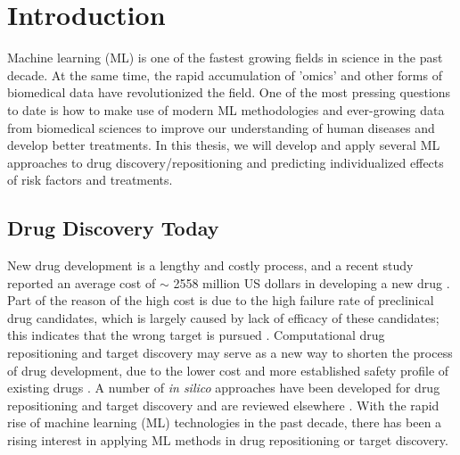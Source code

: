 \chapter{Introduction}
  Machine learning (ML) is one of the fastest growing fields in science in the past decade. At the same time, the rapid accumulation of 'omics' and other forms of biomedical data have revolutionized the field. One of the most pressing questions to date is how to make use of modern ML methodologies and ever-growing data from biomedical sciences to improve our understanding of human diseases and develop better treatments. In this thesis, we will develop and apply several ML approaches to drug discovery/repositioning and predicting individualized effects of risk factors and treatments. 

  \section{Drug Discovery Today}
    New drug development is a lengthy and costly process, and a recent study reported an average cost of $\sim$ 2558 million US dollars in developing a new drug \cite{dimasi2016innovation}. Part of the reason of the high cost is due to the high failure rate of preclinical drug candidates, which is largely caused by lack of efficacy of these candidates; this indicates that the wrong target is pursued \cite{shih2018drug}. Computational drug repositioning and target discovery may serve as a new way to shorten the process of drug development, due to the lower cost and more established safety profile of existing drugs \cite{dudley2011exploiting}. A number of\textit{ in silico }approaches have been developed for drug repositioning and target discovery and are reviewed elsewhere \cite{hodos2016silico,vanhaelen2017design,kandoi2015prediction}. With the rapid rise of machine learning (ML) technologies in the past decade, there has been a rising interest in applying ML methods in drug repositioning or target discovery. 

